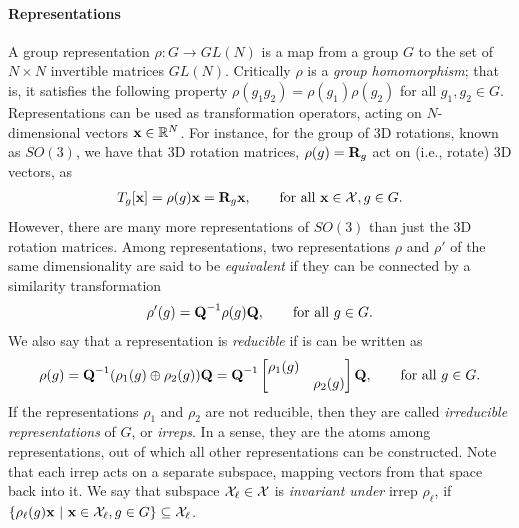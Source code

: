 \paragraph{Representations}
A group representation $\rho: G \to GL(N)$ is a map from a group $G$ to the set of $N\times N$ invertible matrices $GL(N)$. Critically $\rho$ is a \emph{group homomorphism}; that is, it satisfies the following property $\rho(g_1 g_2) = \rho(g_1)\rho(g_2)$ for all $g_1, g_2 \in G$. Representations can be used as transformation operators, acting on $N$-dimensional vectors $\textbf{x} \in \mathbb{R}^N$. For instance, for the group of 3D rotations, known as $SO(3)$, we have that 3D rotation matrices, $\rho(g) = \textbf{R}_g$ act on (i.e., rotate) 3D vectors, as
\begin{align}
    T_g[\textbf{x}] = \rho(g)\textbf{x} = \textbf{R}_g \textbf{x}, \qquad \text{for all } \textbf{x} \in \mathcal{X}, g \in G.
\end{align}
However, there are many more representations of $SO(3)$ than just the 3D rotation matrices. Among representations, two representations $\rho$ and $\rho'$ of the same dimensionality are said to be \emph{equivalent} if they can be connected by a similarity transformation
\begin{align}
    \rho'(g) = \textbf{Q}^{-1} \rho(g) \textbf{Q}, \qquad \text{for all } g \in G.
\end{align}
We also say that a representation is \emph{reducible} if is can be written as
\begin{align}
    \rho(g) = \textbf{Q}^{-1} (\rho_1(g) \oplus \rho_2(g)) \textbf{Q} = \textbf{Q}^{-1} \begin{bmatrix} \rho_1(g) & \\ & \rho_2(g) \end{bmatrix} \textbf{Q}, \qquad \text{for all } g \in G.
\end{align}
If the representations $\rho_1$ and $\rho_2$ are not reducible, then they are called \emph{irreducible representations} of $G$, or \emph{irreps}. In a sense, they are the atoms among representations, out of which all other representations can be constructed. Note that each irrep acts on a separate subspace, mapping vectors from that space back into it. We say that subspace $\mathcal{X}_\ell \in \mathcal{X}$ is \emph{invariant under} irrep $\rho_\ell$, if $\{\rho_\ell(g)\textbf{x} \,\, | \,\, \textbf{x} \in \mathcal{X}_\ell, g \in G \} \subseteq \mathcal{X}_\ell$.

